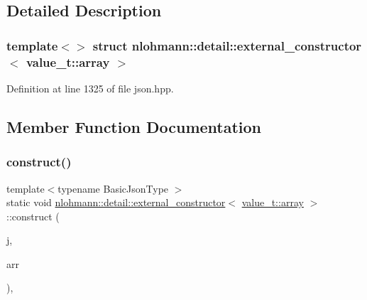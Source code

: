 \subsection{Detailed Description}
\subsubsection*{template$<$$>$\newline
struct nlohmann\+::detail\+::external\+\_\+constructor$<$ value\+\_\+t\+::array $>$}



Definition at line 1325 of file json.\+hpp.



\subsection{Member Function Documentation}
\mbox{\label{structnlohmann_1_1detail_1_1external__constructor_3_01value__t_1_1array_01_4_abfb2a6eec0bc21e8a7438546aebc55d8}} 
\subsubsection{\texorpdfstring{construct()}{construct()}\hspace{0.1cm}{\footnotesize\ttfamily [1/5]}}
{\footnotesize\ttfamily template$<$typename Basic\+Json\+Type $>$ \\
static void \hyperlink{structnlohmann_1_1detail_1_1external__constructor}{nlohmann\+::detail\+::external\+\_\+constructor}$<$ \hyperlink{namespacenlohmann_1_1detail_a1ed8fc6239da25abcaf681d30ace4985af1f713c9e000f5d3f280adbd124df4f5}{value\+\_\+t\+::array} $>$\+::construct (\begin{DoxyParamCaption}\item[{Basic\+Json\+Type \&}]{j,  }\item[{const typename Basic\+Json\+Type\+::array\+\_\+t \&}]{arr }\end{DoxyParamCaption})\hspace{0.3cm}{\ttfamily [inline]}, {\ttfamily [static]}}



